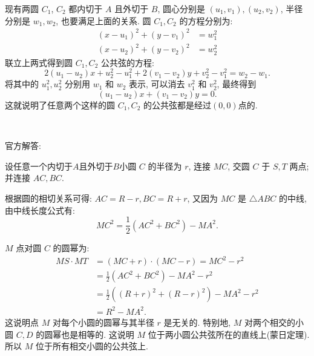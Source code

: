 现有两圆 $C_1$, $C_2$ 都内切于 $A$ 且外切于 $B$, 圆心分别是 $(u_1,v_1), (u_2,v_2)$, 半径分别是 $w_1, w_2$, 也要满足上面的关系. 圆 $C_1, C_2$ 的方程分别为:
\begin{align*}
(x-u_1)^2 + (y-v_1)^2 &= w_1^2 \\
(x-u_2)^2 + (y-v_2)^2 &= w_2^2 
\end{align*}
联立上两式得到圆 $C_1, C_2$ 公共弦的方程:
\[ 2(u_1-u_2)x + u_2^2-u_1^2 + 2(v_1-v_2)y + v_2^2-v_1^2=w_2-w_1 .\]
将其中的 $u_1^2, u_2^2$ 分别用 $w_1$ 和 $w_2$ 表示, 可以消去 $v_1^2$ 和 $v_2^2$, 最终得到
\[ (u_1-u_2)x+(v_1-v_2)y=0 .\]
这就说明了任意两个这样的圆 $C_1, C_2$ 的公共弦都是经过$(0,0)$点的.

~

\noindent 官方解答:

\begin{figure*}[htbp]
\centering
{}
\end{figure*}

设任意一个内切于$A$且外切于$B$小圆 $C$ 的半径为 $r$, 连接 $MC$, 交圆 $C$ 于 $S,T$ 两点; 并连接 $AC, BC$.

根据圆的相切关系可得: $AC=R-r, BC=R+r$, 又因为 $MC$ 是 $\triangle ABC$ 的中线, 由中线长度公式有:
\[ MC^2 = \frac{1}{2}(AC^2+BC^2) - MA^2 .\]

$M$ 点对圆 $C$ 的圆幂为:
\begin{align*} 
MS\cdot MT &= (MC+r)\cdot(MC-r) = MC^2-r^2 \\
&=\frac{1}{2}(AC^2+BC^2) - MA^2-r^2 \\
&=  \frac{1}{2}\left((R+r)^2+(R-r)^2\right) - MA^2-r^2\\
&= R^2 - MA^2.
\end{align*}
这说明点 $M$ 对每个小圆的圆幂与其半径 $r$ 是无关的. 特别地, $M$ 对两个相交的小圆 $C,D$ 的圆幂也是相等的. 这说明 $M$ 位于两小圆公共弦所在的直线上(蒙日定理). 所以 $M$ 位于所有相交小圆的公共弦上.

